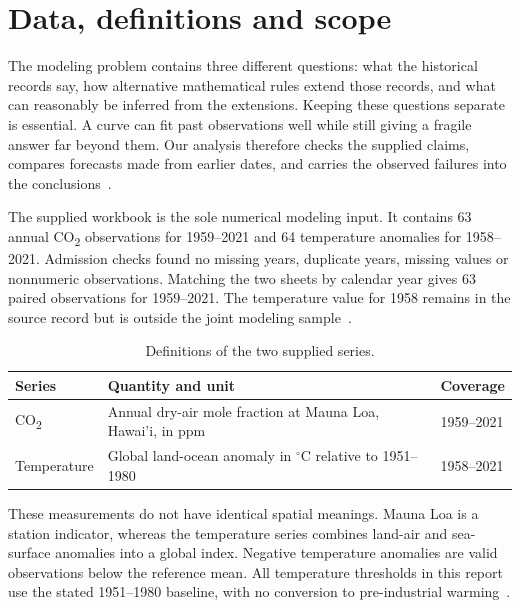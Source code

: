 \documentclass[11pt,a4paper]{article}
\newcommand{\p}[2]{#2\par}
\newcommand{\txt}[2]{#2}
\newcommand{\CO}{CO\textsubscript{2}}
\newcommand{\degC}{\ensuremath{{}^{\circ}\mathrm{C}}}
\begin{document}
\section{Data, definitions and scope}\label{sec:data}
\p{DAT01}{The modeling problem contains three different questions: what the historical records say, how alternative mathematical rules extend those records, and what can reasonably be inferred from the extensions. Keeping these questions separate is essential. A curve can fit past observations well while still giving a fragile answer far beyond them. Our analysis therefore checks the supplied claims, compares forecasts made from earlier dates, and carries the observed failures into the conclusions~\cite{problem}.}
\p{DAT02}{The supplied workbook is the sole numerical modeling input. It contains 63 annual \CO{} observations for 1959--2021 and 64 temperature anomalies for 1958--2021. Admission checks found no missing years, duplicate years, missing values or nonnumeric observations. Matching the two sheets by calendar year gives 63 paired observations for 1959--2021. The temperature value for 1958 remains in the source record but is outside the joint modeling sample~\cite{workbook}.}
\begin{table}[H]\centering\small
\caption{\txt{TC01}{Definitions of the two supplied series.}}\label{tab:data}
\begin{tabular}{p{.17\linewidth}p{.58\linewidth}p{.17\linewidth}}\toprule
Series & Quantity and unit & Coverage\\\midrule
\CO{} & Annual dry-air mole fraction at Mauna Loa, Hawai'i, in ppm & 1959--2021\\
Temperature & Global land-ocean anomaly in \degC{} relative to 1951--1980 & 1958--2021\\\bottomrule
\end{tabular}
\end{table}
\p{DAT03}{These measurements do not have identical spatial meanings. Mauna Loa is a station indicator, whereas the temperature series combines land-air and sea-surface anomalies into a global index. Negative temperature anomalies are valid observations below the reference mean. All temperature thresholds in this report use the stated 1951--1980 baseline, with no conversion to pre-industrial warming~\cite{noaa-data,nasa}.}
\end{document}
